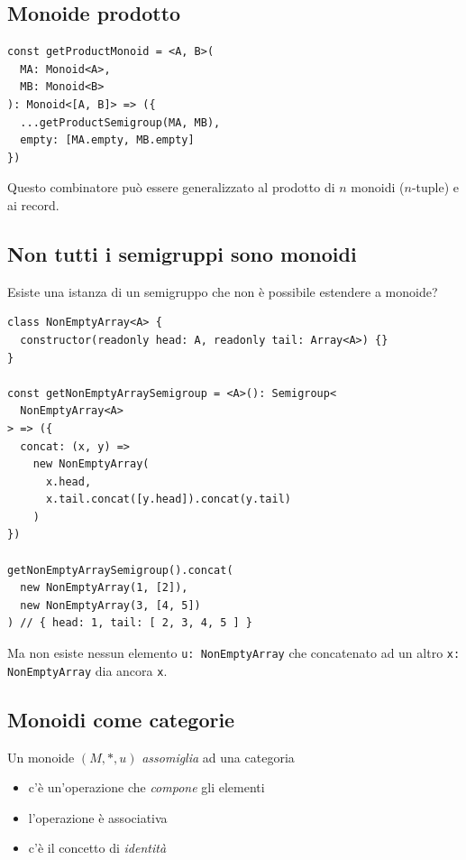 \documentclass[12pt]{article}
\begin{document}
\subsection{Monoide prodotto}

\begin{verbatim}
const getProductMonoid = <A, B>(
  MA: Monoid<A>,
  MB: Monoid<B>
): Monoid<[A, B]> => ({
  ...getProductSemigroup(MA, MB),
  empty: [MA.empty, MB.empty]
})
\end{verbatim}

Questo combinatore può essere generalizzato al prodotto di $n$ monoidi ($n$-tuple) e ai record.

\subsection{Non tutti i semigruppi sono monoidi}

Esiste una istanza di un semigruppo che non è possibile estendere a monoide?

\begin{verbatim}
class NonEmptyArray<A> {
  constructor(readonly head: A, readonly tail: Array<A>) {}
}

const getNonEmptyArraySemigroup = <A>(): Semigroup<
  NonEmptyArray<A>
> => ({
  concat: (x, y) =>
    new NonEmptyArray(
      x.head,
      x.tail.concat([y.head]).concat(y.tail)
    )
})

getNonEmptyArraySemigroup().concat(
  new NonEmptyArray(1, [2]),
  new NonEmptyArray(3, [4, 5])
) // { head: 1, tail: [ 2, 3, 4, 5 ] }
\end{verbatim}

Ma non esiste nessun elemento \texttt{u: NonEmptyArray} che concatenato ad un altro \texttt{x: NonEmptyArray} dia ancora \texttt{x}.

\subsection{Monoidi come categorie}

Un monoide $(M, *, u)$ \emph{assomiglia} ad una categoria

\begin{itemize}
  \item c'è un'operazione che \emph{compone} gli elementi
  \item l'operazione è associativa
  \item c'è il concetto di \emph{identità}
\end{itemize}
\end{document}
